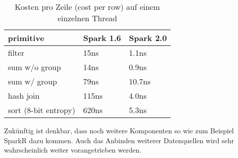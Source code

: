 \begin{table}[h]
  \centering
		
		  \begin{tabular}[t]{|l|l|l|}
    \hline
		
		\rowcolor[gray]{.9}
		
				primitive	 & Spark 1.6 &  Spark 2.0 \\ \hline				
				filter &	15ns &	1.1ns \\ \hline				
				sum w/o group &	14ns &	0.9ns \\ \hline				
				sum w/ group &	79ns &	10.7ns \\ \hline				
				hash join	& 115ns	& 4.0ns \\ \hline				
				sort (8-bit entropy)	& 620ns	 & 5.3ns \\ \hline				

  \end{tabular}
		
  \caption{Kosten pro Zeile (cost per row) auf einem einzelnen Thread}\label{tab:spark_2_0}
\end{table}



\noindent
Zukünftig ist denkbar, dass noch weitere Komponenten so wie zum Beispiel SparkR dazu kommen. Auch das Anbinden weiterer Datenquellen wird sehr wahrscheinlich weiter vorangetrieben werden.
